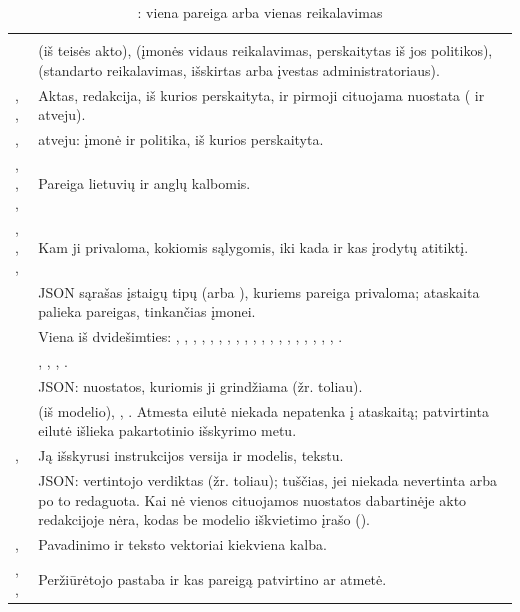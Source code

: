 \begin{xltabular}{\textwidth}{@{}L{38mm}Y@{}}
\caption{: viena pareiga arba vienas reikalavimas}\label{tab:data:ob}\\
\toprule
{} &  \\
\midrule
\endfirsthead
\toprule
{} &  \\
\midrule
\endhead
\bottomrule
\endlastfoot
{} &  (iš teisės akto),  (įmonės vidaus reikalavimas, perskaitytas iš jos politikos),  (standarto reikalavimas, išskirtas arba įvestas administratoriaus). \\
, ,  & Aktas, redakcija, iš kurios perskaityta, ir pirmoji cituojama nuostata ( ir  atveju). \\
,  &  atveju: įmonė ir politika, iš kurios perskaityta. \\
, , ,  & Pareiga lietuvių ir anglų kalbomis. \\
, , ,  & Kam ji privaloma, kokiomis sąlygomis, iki kada ir kas įrodytų atitiktį. \\
 & JSON sąrašas įstaigų tipų (arba ), kuriems pareiga privaloma; ataskaita palieka pareigas, tinkančias įmonei. \\
 & Viena iš dvidešimties: , , , , , , , , , , , , , , , , , , , . \\
 & , , , . \\
 & JSON: nuostatos, kuriomis ji grindžiama (žr. toliau). \\
 &  (iš modelio), , . Atmesta eilutė niekada nepatenka į ataskaitą; patvirtinta eilutė išlieka pakartotinio išskyrimo metu. \\
,  & Ją išskyrusi instrukcijos versija ir modelis, tekstu. \\
 & JSON: vertintojo verdiktas (žr. toliau); tuščias, jei niekada nevertinta arba po to redaguota. Kai nė vienos cituojamos nuostatos dabartinėje akto redakcijoje nėra, kodas be modelio iškvietimo įrašo  (). \\
,  & Pavadinimo ir teksto vektoriai kiekviena kalba. \\
, ,  & Peržiūrėtojo pastaba ir kas pareigą patvirtino ar atmetė. \\
\end{xltabular}

